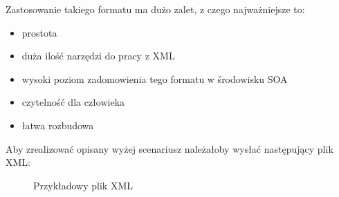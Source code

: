 Zastosowanie takiego formatu ma dużo zalet, z czego najważniejsze to:
\begin{itemize}
	\item prostota
	\item duża ilość narzędzi do pracy z XML
	\item wysoki poziom zadomowienia tego formatu w środowisku SOA
	\item czytelność dla człowieka
	\item łatwa rozbudowa
\end{itemize}
Aby zrealizować opisany wyżej scenariusz należałoby wysłać następujący plik XML:

\setlength\fboxsep{20pt}
\setlength\fboxrule{1pt}
\begin{figure}[!h]
	\centering
	\caption{Przykładowy plik XML}
\end{figure}

